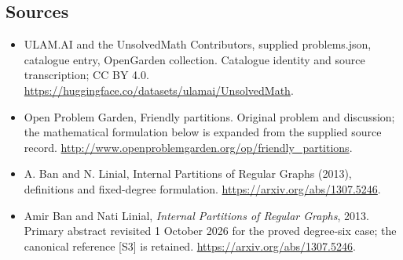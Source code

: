 \documentclass[11pt,a4paper]{article}
\begin{document}
\subsection{Sources}
\begin{itemize}
\item[S1] ULAM.AI and the UnsolvedMath Contributors, supplied problems.json, catalogue entry, OpenGarden collection. Catalogue identity and source transcription; CC BY 4.0.
\url{https://huggingface.co/datasets/ulamai/UnsolvedMath}.
\item[S2] Open Problem Garden, Friendly partitions. Original problem and discussion; the mathematical formulation below is expanded from the supplied source record.
\url{http://www.openproblemgarden.org/op/friendly_partitions}.
\item[S3] A. Ban and N. Linial, Internal Partitions of Regular Graphs (2013), definitions and fixed-degree formulation.
\url{https://arxiv.org/abs/1307.5246}.

\item[R1] Amir Ban and Nati Linial, \emph{Internal Partitions of Regular
Graphs}, 2013. Primary abstract revisited 1 October 2026 for the
proved degree-six case; the canonical reference [S3] is retained.
\url{https://arxiv.org/abs/1307.5246}.

\end{itemize}
\end{document}
